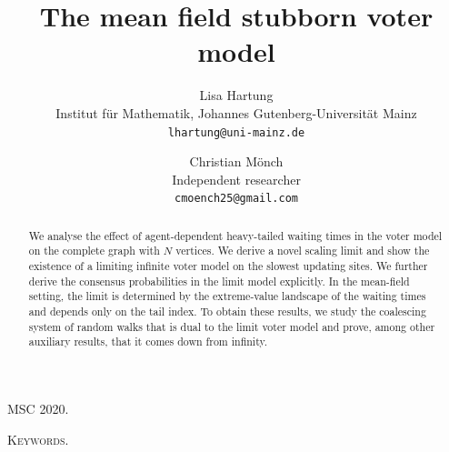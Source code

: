 \documentclass[11pt,a4paper]{scrartcl}
\title{The mean field stubborn voter model}
\author{%
Lisa Hartung\\
\small Institut f\"ur Mathematik, Johannes Gutenberg-Universit\"at Mainz\\
\small \texttt{lhartung@uni-mainz.de}
\and
Christian M\"onch\\
\small Independent researcher\\
\small \texttt{cmoench25@gmail.com}
}
\date{}
\numberwithin{equation}{section}
\def\mystyleMSC{}
\def\mystyleKeywords{}
\newcommand*\PrintMSCKeywords{%
  \par\smallskip
  \begingroup
  \small
  \noindent\textsc{MSC 2020.} \mystyleMSC\par
  \noindent\textsc{Keywords.} \mystyleKeywords\par
  \endgroup
}
\theoremstyle{plain}
\theoremstyle{definition}
\theoremstyle{remark}
\newcommand{\bE}{\ensuremath{\mathbb{E}}}
\newcommand{\bN}{\ensuremath{\mathbb{N}}}
\newcommand{\bP}{\ensuremath{\mathbb{P}}}
\newcommand{\ind}{\ensuremath{\mathbbm{1}}}
\newcommand{\norm}[1]{\left\Vert \, #1 \, \right\Vert}
\newcommand{\hP}{\widehat{\bP}}
\newcommand{\hE}{\widehat{\bE}}
\newcommand{\bfP}{\mathbf{P}}
\newcommand{\TV}{\mathrm{TV}}
\begin{document}
\maketitle

\begin{abstract}
We analyse the effect of agent-dependent heavy-tailed waiting times in the voter model on the complete graph with $N$ vertices. We derive a novel scaling limit and show the existence of a limiting infinite voter model on the slowest updating sites. We further derive the consensus probabilities in the limit model explicitly. In the mean-field setting, the limit is determined by the extreme-value landscape of the waiting times and depends only on the tail index. To obtain these results, we study the coalescing system of random walks that is dual to the limit voter model and prove, among other auxiliary results, that it comes down from infinity.
\end{abstract}
\PrintMSCKeywords



\end{document}
